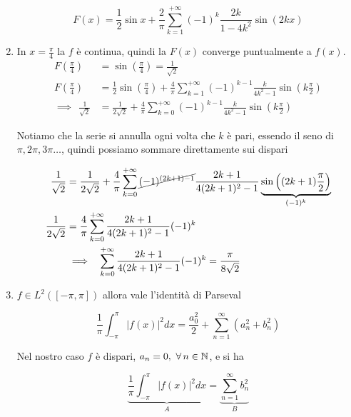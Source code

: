\begin{enumerate}
\begin{equation*}
F( x) =\frac{1}{2}\sin x+\frac{2}{\pi }\sum ^{+\infty }_{k=1}( -1)^{k}\frac{2k}{1-4k^{2}}\sin( 2kx)
\end{equation*}
\item In $x=\frac{\pi }{4}$ la $f$ è continua, quindi la $F( x)$ converge puntualmente a $f( x)$.\begin{align*}
F\left(\frac{\pi }{4}\right) & =\sin\left(\frac{\pi }{4}\right) =\frac{1}{\sqrt{2}}\\
F\left(\frac{\pi }{4}\right) & =\frac{1}{2}\sin\left(\frac{\pi }{4}\right) +\frac{4}{\pi }\sum ^{+\infty }_{k=1}( -1)^{k-1}\frac{k}{4k^{2} -1}\sin\left( k\frac{\pi }{2}\right)\\
\implies \ \ \frac{1}{\sqrt{2}} & =\frac{1}{2\sqrt{2}} +\frac{4}{\pi }\sum ^{+\infty }_{k=0}( -1)^{k-1}\frac{k}{4k^{2} -1}\sin\left( k\frac{\pi }{2}\right)
\end{align*}

Notiamo che la serie si annulla ogni volta che $k$ è pari, essendo il seno di $\pi ,2\pi ,3\pi \dotsc $, quindi possiamo sommare direttamente sui dispari

\begin{equation*}
\begin{aligned}
\frac{1}{\sqrt{2}} & =\frac{1}{2\sqrt{2}} +\frac{4}{\pi }\sum ^{+\infty }_{k=0}\cancel{( -1)^{( 2k+1) -1}}\frac{2k+1}{4( 2k+1)^{2} -1}\underbrace{\sin\left(( 2k+1)\frac{\pi }{2}\right)}_{( -1)^{k}}\\
\frac{1}{2\sqrt{2}} & =\frac{4}{\pi }\sum ^{+\infty }_{k=0}\frac{2k+1}{4( 2k+1)^{2} -1}( -1)^{k}\\
 & \implies \ \ \sum ^{+\infty }_{k=0}\frac{2k+1}{4( 2k+1)^{2} -1}( -1)^{k} =\frac{\pi }{8\sqrt{2}}
\end{aligned}
\end{equation*}
\item $f\in L^{2}([ -\pi ,\pi ])$ allora vale l'identità di Parseval

\begin{equation*}
\frac{1}{\pi }\int ^{\pi }_{-\pi }| f( x)| ^{2} dx=\frac{a^{2}_{0}}{2} +\sum\limits ^{\infty }_{n=1}\left( a^{2}_{n} +b^{2}_{n}\right)
\end{equation*}

Nel nostro caso $f$ è dispari, $a_{n} =0,\ \forall n\in \NN $, e si ha

\begin{equation*}
\underbrace{\frac{1}{\pi }\int ^{\pi }_{-\pi }| f( x)| ^{2} dx}_{A} =\underbrace{\sum\limits ^{\infty }_{n=1} b^{2}_{n}}_{B}
\end{equation*}


\end{enumerate}
